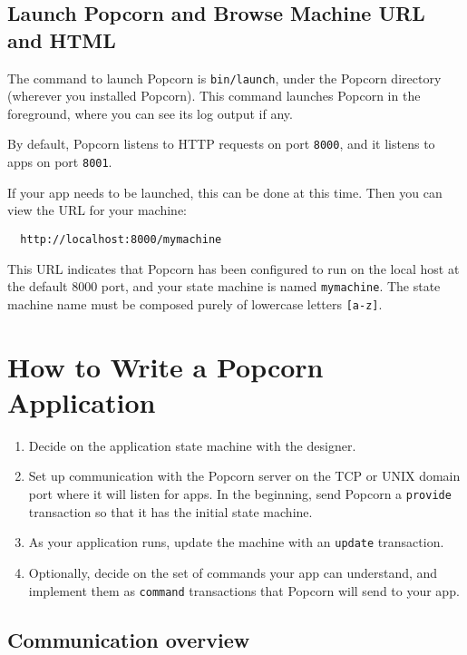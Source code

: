 \documentclass[12pt]{article}
\begin{document}
\subsection{Launch Popcorn and Browse Machine URL and HTML}

The command to launch Popcorn is \verb`bin/launch`, under the Popcorn
directory (wherever you installed Popcorn). This command launches
Popcorn in the foreground, where you can see its log output if any.

By default, Popcorn listens to HTTP requests on port \verb`8000`, and it
listens to apps on port \verb`8001`.

If your app needs to be launched, this can be done at this time. Then
you can view the URL for your machine:

\begin{verbatim}
  http://localhost:8000/mymachine
\end{verbatim}

This URL indicates that Popcorn has been configured to run on the
local host at the default 8000 port, and your state machine is named
\verb`mymachine`. The state machine name must be composed purely of
lowercase letters \verb`[a-z]`.


\section{How to Write a Popcorn Application}

\begin{enumerate}

\item Decide on the application state machine with the designer.

\item Set up communication with the Popcorn server on the TCP or UNIX
  domain port where it will listen for apps. In the beginning, send
  Popcorn a \verb`provide` transaction so that it has the initial
  state machine.

\item As your application runs, update the machine with an
\verb`update` transaction.

\item Optionally, decide on the set of commands your app can
  understand, and implement them as \verb`command` transactions that
  Popcorn will send to your app.

\end{enumerate}

\subsection{Communication overview}
\end{document}

